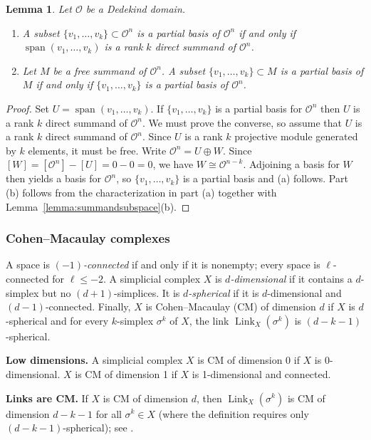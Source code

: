 \documentclass[11 pt]{article}
\theoremstyle{plain}
\newtheorem{lemma}[theorem]{Lemma}
\theoremstyle{definition}
\numberwithin{equation}{section}
\newcommand{\para}[1]{\bigskip\noindent\textbf{#1.}}
\renewcommand{\O}{\mathcal{O}}
\DeclareMathOperator{\Link}{Link}
\DeclareMathOperator\spn{span}
\newcommand\iso{\cong}
\begin{document}
\begin{lemma}
Let $\O$ be a Dedekind domain.
\label{lemma:partialbasissub}
\begin{enumerate}[label={\normalfont (\alph*)},topsep=2pt,itemsep=1pt,parsep=1pt]
\item A subset $\{v_1,\ldots,v_k\}\subset \O^n$ is a partial basis of $\O^n$ if and only if $\spn(v_1,\ldots,v_k)$ 
is a rank $k$ direct summand of $\O^n$.
\item Let $M$ be a free summand of $\O^n$. A subset $\{v_1,\ldots,v_k\}\subset M$ is a partial basis of $M$ 
if and only if $\{v_1,\ldots,v_k\}$ is a partial basis of $\O^n$. 
\end{enumerate}
\end{lemma}
\begin{proof}
Set $U=\spn(v_1,\ldots,v_k)$.  If $\{v_1,\ldots,v_k\}$ is a partial basis for $\O^n$ then
$U$ is  a rank $k$ direct summand of $\O^n$.  We must prove the converse, so assume that $U$ is a
rank $k$ direct summand of $\O^n$.  Since $U$ is a rank $k$ projective module generated by $k$ elements,
it must be free.  Write $\O^n = U \oplus W$.  Since $[W]=[\O^n]-[U]=0-0=0$, we have $W\iso \O^{n-k}$.  Adjoining a basis 
for $W$ then yields a basis for $\O^n$, so $\{v_1,\ldots,v_k\}$ is a partial basis and (a) follows.
Part (b) follows from the characterization in part (a) together with Lemma~\ref{lemma:summandsubspace}(b).
\end{proof}

\subsubsection{Cohen--Macaulay complexes}
A space is {\em $(-1)$-connected} if and only if it is nonempty; every space is $\ell$-connected for $\ell \leq -2$.
A simplicial complex $X$ is {\em $d$-dimensional} if it contains a $d$-simplex but no $(d+1)$-simplices.  It is {\em $d$-spherical}
if it is $d$-dimensional and $(d-1)$-connected.
Finally, $X$ is Cohen--Macaulay (CM) of dimension $d$ if $X$ is $d$-spherical
and for every $k$-simplex $\sigma^k$ of $X$, the link $\Link_X(\sigma^k)$ is $(d-k-1)$-spherical.

\para{Low dimensions}
A simplicial complex $X$ is CM of dimension 0 if $X$ is 0-dimensional.   $X$ is CM of dimension 1 if $X$ is 1-dimensional and connected.

\para{Links are CM}
If $X$ is CM of dimension $d$, then $\Link_X(\sigma^k)$ is CM of dimension $d-k-1$ for all $\sigma^k\in X$ (where the definition requires only $(d-k-1)$-spherical); see \cite[Proposition~8.6]{QuillenPoset}.
\end{document}
